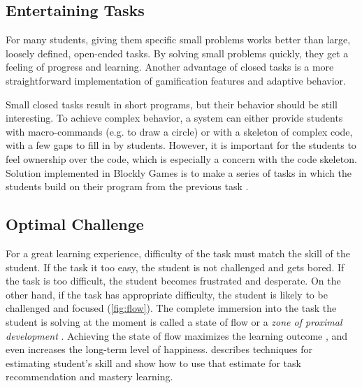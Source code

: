 \subsection{Entertaining Tasks}
\label{sec:motivation.tasks}
For many students, giving them specific small problems works better
  than large, loosely defined, open-ended tasks.
By solving small problems quickly,
  they get a feeling of progress and learning.
Another advantage of closed tasks
  is a more straightforward implementation of gamification features and adaptive behavior.

Small closed tasks result in short programs,
  but their behavior should be still interesting. %
To achieve complex behavior,
  a system can either provide students with macro-commands (e.g. to draw a circle)
  or with a skeleton of complex code, with a few gaps to fill in by students.
However, it is important for the students to feel ownership over the code,
  which is especially a concern with the code skeleton.
Solution implemented in Blockly Games
  is to make a series of tasks in which the students
  build on their program from the previous task
  \cite{blockly-10-things}.



\subsection{Optimal Challenge}  %
\label{sec:motivation.challenge}
For a great learning experience,
  difficulty of the task must match the skill of the student.
If the task it too easy,
  the student is not challenged and gets bored.
If the task is too difficult,
  the student becomes frustrated and desperate.
On the other hand, if the task has appropriate difficulty,
  the student is likely to be challenged and focused
  (\cref{fig:flow}).
The complete immersion into the task the student is solving at the moment is called
  a state of flow \cite{flow}
  or a \emph{zone of proximal development} \cite{zone-of-proximal-development}.
Achieving the state of flow maximizes the learning outcome \cite{adaptive-practice},
  and even increases the long-term level of happiness. %
 describes techniques for estimating student’s skill
  and show how to use that estimate for task recommendation and mastery learning.


